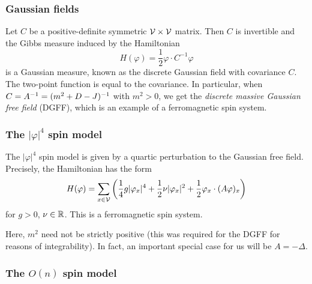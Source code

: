 
\subsubsection{Gaussian fields}

Let $C$ be a positive-definite symmetric $\mathcal{V}\times\mathcal{V}$ matrix.
Then $C$ is invertible and the Gibbs measure induced by the Hamiltonian
\begin{equation}
H(\varphi) = \frac{1}{2} \varphi \cdot C^{-1} \varphi
\end{equation}
is a Gaussian measure, known as the discrete Gaussian field with covariance $C$.
The two-point function is equal to the covariance.
In particular, when $C = A^{-1} = (m^2 + D - J)^{-1}$ with $m^2 > 0$, we get the
\emph{discrete massive Gaussian free field} (DGFF), which is an example of a ferromagnetic
spin system.


\subsubsection{The $|\varphi|^4$ spin model}

The $|\varphi|^4$ spin model is given by a quartic perturbation to the Gaussian free field.
Precisely, the Hamiltonian has the form
\begin{equation}
H(\varphi)
  =
\sum_{x\in\mathcal{V}}
\left(
  \frac{1}{4} g |\varphi_x|^4
    +
  \frac{1}{2} \nu |\varphi_x|^2
    +
  \frac{1}{2} \varphi_x \cdot (A \varphi)_x
\right)
\end{equation}
for $g > 0$, $\nu\in{\mathbb R}$. This is a ferromagnetic spin system.

Here, $m^2$ need not be strictly positive (this was required for the DGFF for reasons of
integrability). In fact, an important special case for us will be $A = -\Delta$.


\subsubsection{The $O(n)$ spin model}

